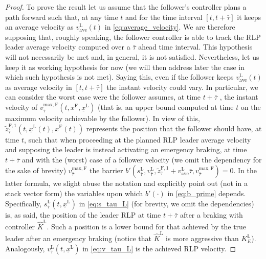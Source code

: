 \documentclass[letterpaper, 10 pt, conference]{ieeeconf}
\theoremstyle{definition}
\theoremstyle{nopoint}
\begin{document}
\begin{proof}
To prove the result let us assume that the follower's controller plans a path forward such that, at any time $t$ and for the time interval $[t, t+\bar{\tau}]$ it keeps an average velocity as $v_{\mathrm{ave}}^\mathrm{L}(t)$ in  \eqref{eq:average_velocity}.
We are therefore supposing that, roughly speaking, the follower controller is able to track the RLP leader average velocity  computed over a $\bar{\tau}$ ahead time interval. This hypothesis will not necessarily be met and, in general, it is not satisfied. Nevertheless, let us keep it as working hypothesis for now (we will then address later the case in which such hypothesis is not met).
Saying this, even if the follower keeps $v_{\mathrm{ave}}^\mathrm{L}(t)$ as average velocity in $[t, t+\bar{\tau}]$ the instant velocity could vary. In particular, we can consider the worst case were the follower assumes, at time $t+\bar{\tau}$ , the instant velocity of $v_{\bar{\tau}}^{\mathrm{max}, \mathrm{F}}(t, x^\mathrm{F}, \underline{x}^\mathrm{L})$ (that is, an upper bound computed at time $t$ on the maximum velocity achievable by the follower).
In view of this, $\tilde{z}^{\mathrm{F},1}_{\bar{\tau}} (t,\underline{x}^\mathrm{L}(t),x^\mathrm{F}(t))$ represents the position that the follower should have, at time $t$, such that when proceeding at the planned RLP leader average velocity and supposing the leader is instead activating an emergency braking, at time $t+\bar{\tau}$ and with the (worst) case of a follower velocity (we omit the dependency for the sake of brevity) $v_{\bar{\tau}}^{\mathrm{max}, \mathrm{F}}$ the barrier $b'(s_{\bar{\tau}}^\mathrm{L},v_{\bar{\tau}}^\mathrm{L},\tilde{z}^{\mathrm{F},1}_{\bar{\tau}}+v_{\mathrm{ave}}^\mathrm{L}\bar{\tau},v_{\bar{\tau}}^{\mathrm{max}, \mathrm{F}})=0$. In the latter formula, we slight abuse the notation and explicitly point out (not in a stack vector form) the variables upon which $b'(\cdot)$ in \eqref{eq:b_prime} depends. Specifically,  $s_{\bar{\tau}}^\mathrm{L}\left( t,\underline{x}^\mathrm{L} \right)$ in \eqref{eq:s_tau_L} (for brevity, we omit the dependencies) is, as said, the position of the leader RLP at time $t+\bar{\tau}$ after a braking with controller $\hat{K}^\mathrm{L}$. Such a position is a lower bound for that achieved by the true leader after an emergency braking (notice that $\hat{K}^\mathrm{L}$ is  more aggressive than $K^\mathrm{L}_E$). Analogously, $v_{\bar{\tau}}^\mathrm{L}\left( t,\underline{x}^\mathrm{L} \right)$  in \eqref{eq:v_tau_L} is the achieved RLP velocity. 


\end{proof}
\end{document}

